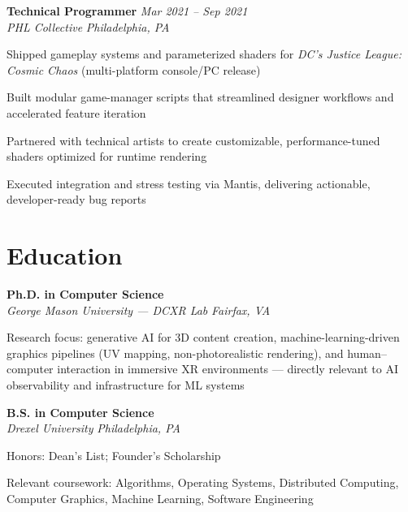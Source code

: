 \documentclass[letterpaper,10pt]{article}
\newcommand{\role}[4]{%
  \textbf{#1} \hfill \textit{#3}\\[-1pt]
  \textit{#2} \hfill \textit{#4}\par\vspace{2pt}
}
\newcommand{\education}[4]{%
  \textbf{#1} \hfill \textit{#3}\\[-1pt]
  \textit{#2} \hfill \textit{#4}\par\vspace{2pt}
}
\begin{document}
\role{Technical Programmer}{PHL Collective}{Mar 2021 -- Sep 2021}{Philadelphia, PA}
\begin{tightitemize}
  \item Shipped gameplay systems and parameterized shaders for \textit{DC's Justice League: Cosmic Chaos} (multi-platform console/PC release)
  \item Built modular game-manager scripts that streamlined designer workflows and accelerated feature iteration
  \item Partnered with technical artists to create customizable, performance-tuned shaders optimized for runtime rendering
  \item Executed integration and stress testing via Mantis, delivering actionable, developer-ready bug reports
\end{tightitemize}

\section*{Education}
\education{Ph.D. in Computer Science}{George Mason University --- DCXR Lab}{}{Fairfax, VA}
\begin{tightitemize}
  \item Research focus: generative AI for 3D content creation, machine-learning-driven graphics pipelines (UV mapping, non-photorealistic rendering), and human--computer interaction in immersive XR environments — directly relevant to AI observability and infrastructure for ML systems
\end{tightitemize}

\education{B.S. in Computer Science}{Drexel University}{}{Philadelphia, PA}
\begin{tightitemize}
  \item Honors: Dean's List; Founder's Scholarship
  \item Relevant coursework: Algorithms, Operating Systems, Distributed Computing, Computer Graphics, Machine Learning, Software Engineering
\end{tightitemize}

\end{document}
